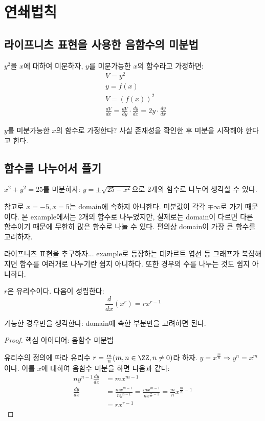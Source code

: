 \documentclass[../note.tex]{subfiles}
\begin{document}
\section{연쇄법칙}

\subsection{라이프니츠 표현을 사용한 음함수의 미분법}
\begin{example}
  $y^2$을 $x$에 대하여 미분하자, $y$를 미분가능한 $x$의 함수라고 가정하면:
  \begin{align}
    &V = y^2 \\
    &y = f(x) \\
    &V = (f(x))^2 \\
    &\frac{dV}{dx} = \frac{dV}{dy} \cdot \frac{dy}{dx} = 2y \cdot \frac{dy}{dx}
  \end{align}
\end{example}

\begin{note}
  $y$를 미분가능한 $x$의 함수로 가정한다? 사실 존재성을 확인한 후 미분을 시작해야 한다고 한다.
\end{note}

\subsection{함수를 나누어서 풀기}
\begin{example}
  $x^2+y^2=25$를 미분하자:
  $y=\pm\sqrt{25-x^2}$으로 2개의 함수로 나누어 생각할 수 있다.
\end{example}
참고로 $x=-5, x=5$는 domain에 속하지 아니한다. 미분값이 각각 $\mp \infty$로 가기 때문이다. 본 example에서는 2개의 함수로 나누었지만, 실제로는 domain이 다르면 다른 함수이기 때문에 무한히 많은 함수로 나눌 수 있다. 편의상 domain이 가장 큰 함수를 고려하자.

라이프니츠 표현을 추구하자... example로 등장하는 데카르트 엽선 등 그래프가 복잡해지면 함수를 여러개로 나누기란 쉽지 아니하다. 또한 경우의 수를 나누는 것도 쉽지 아니하다.

\begin{theorem}
  $r$은 유리수이다. 다음이 성립한다:
  \begin{equation}
    \frac{d}{dx}(x^r) = rx^{r-1}
  \end{equation}
\end{theorem}
가능한 경우만을 생각한다: domain에 속한 부분만을 고려하면 된다.

\begin{proof}
  핵심 아이디어: 음함수 미분법

  유리수의 정의에 따라 유리수 $r=\frac{m}{n} (m,n \in \ZZ, n \neq 0)$라 하자. $y=x^{\frac{m}{n}} \Rightarrow y^n=x^m$이다. 이를 $x$에 대하여 음함수 미분을 하면 다음과 같다:
  \begin{align}
    ny^{n-1}\frac{dy}{dx} &= mx^{m-1} \\
    \frac{dy}{dx} &= \frac{mx^{m-1}}{ny^{n-1}} = \frac{mx^{m-1}}{nx^{\frac{m}{n}-1}} = \frac{m}{n}x^{\frac{m}{n}-1} \\
                  &= rx^{r-1}
  \end{align}
\end{proof}
\end{document}
